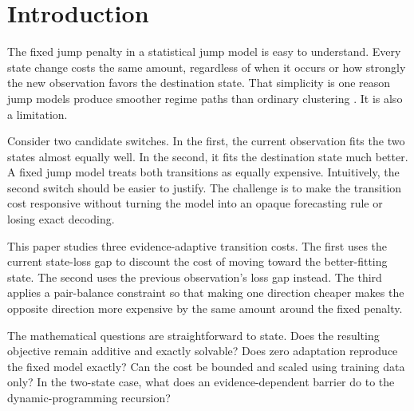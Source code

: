 
\section{Introduction}

The fixed jump penalty in a statistical jump model is easy to understand. Every
state change costs the same amount, regardless of when it occurs or how strongly
the new observation favors the destination state. That simplicity is one reason
jump models produce smoother regime paths than ordinary clustering
\citep{bemporad2018,nystrup2020}. It is also a limitation.

Consider two candidate switches. In the first, the current observation fits the
two states almost equally well. In the second, it fits the destination state
much better. A fixed jump model treats both transitions as equally expensive.
Intuitively, the second switch should be easier to justify. The challenge is to
make the transition cost responsive without turning the model into an opaque
forecasting rule or losing exact decoding.

This paper studies three evidence-adaptive transition costs. The first uses the
current state-loss gap to discount the cost of moving toward the better-fitting
state. The second uses the previous observation's loss gap instead. The third
applies a pair-balance constraint so that making one direction cheaper makes the
opposite direction more expensive by the same amount around the fixed penalty.

The mathematical questions are straightforward to state. Does the resulting
objective remain additive and exactly solvable? Does zero adaptation reproduce
the fixed model exactly? Can the cost be bounded and scaled using training data
only? In the two-state case, what does an evidence-dependent barrier do to the
dynamic-programming recursion?

